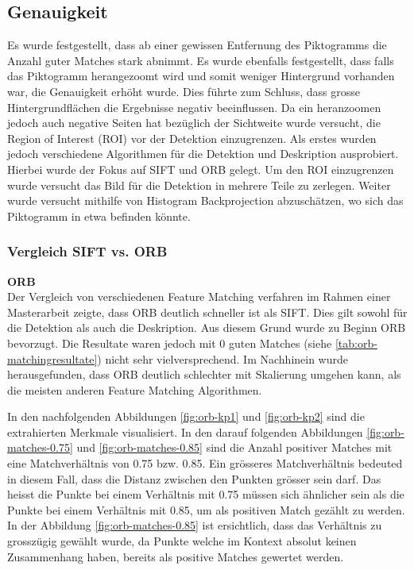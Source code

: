 \subsection{Genauigkeit}
Es wurde festgestellt, dass ab einer gewissen Entfernung des Piktogramms die Anzahl guter Matches stark abnimmt. Es wurde ebenfalls festgestellt, dass falls das Piktogramm herangezoomt wird und somit weniger Hintergrund vorhanden war, die Genauigkeit erhöht wurde. Dies führte zum Schluss, dass grosse Hintergrundflächen die Ergebnisse negativ beeinflussen. Da ein heranzoomen jedoch auch negative Seiten hat bezüglich der Sichtweite wurde versucht, die Region of Interest (ROI) vor der Detektion einzugrenzen. Als erstes wurden jedoch verschiedene Algorithmen für die Detektion und Deskription ausprobiert. Hierbei wurde der Fokus auf SIFT und ORB gelegt. Um den ROI einzugrenzen wurde versucht das Bild für die Detektion in mehrere Teile zu zerlegen. Weiter wurde versucht mithilfe von Histogram Backprojection abzuschätzen, wo sich das Piktogramm in etwa befinden könnte.

\subsubsection{Vergleich SIFT vs. ORB}
\textbf{ORB}\\
Der Vergleich von verschiedenen Feature Matching verfahren im Rahmen einer Masterarbeit \cite{feature-matching-riegler-ma} zeigte, dass ORB deutlich schneller ist als SIFT. Dies gilt sowohl für die Detektion als auch die Deskription. Aus diesem Grund wurde zu Beginn ORB bevorzugt. Die Resultate waren jedoch mit 0 guten Matches (siehe \ref{tab:orb-matchingresultate}) nicht sehr vielversprechend. Im Nachhinein wurde herausgefunden, dass ORB deutlich schlechter mit Skalierung umgehen kann, als die meisten anderen Feature Matching Algorithmen. 

In den nachfolgenden Abbildungen \ref{fig:orb-kp1} und \ref{fig:orb-kp2} sind die extrahierten Merkmale visualisiert. In den darauf folgenden Abbildungen \ref{fig:orb-matches-0.75} und \ref{fig:orb-matches-0.85} sind die Anzahl positiver Matches mit eine Matchverhältnis von 0.75 bzw. 0.85. Ein grösseres Matchverhältnis bedeuted in diesem Fall, dass die Distanz zwischen den Punkten grösser sein darf. Das heisst die Punkte bei einem Verhältnis mit 0.75 müssen sich ähnlicher sein als die Punkte bei einem Verhältnis mit 0.85, um als positiven Match gezählt zu werden. In der Abbildung \ref{fig:orb-matches-0.85} ist ersichtlich, dass das Verhältnis zu grosszügig gewählt wurde, da Punkte welche im Kontext absolut keinen Zusammenhang haben, bereits als positive Matches gewertet werden.

